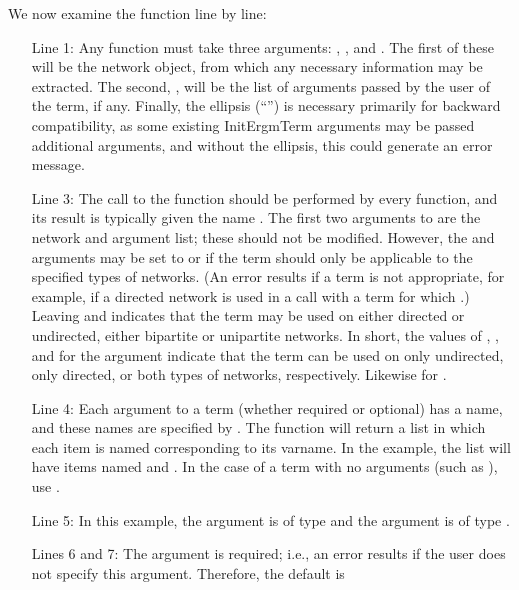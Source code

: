 \documentclass[nojss]{jss}
\begin{document}
We now examine the  function line by line:
\begin{itemize}
\item[Line 1:]
Any  function must take three arguments:
, , and .  The first of these will be the network object, from
which any necessary information may be extracted.  The second, ,
will be the list of arguments passed by the user of the term, if any.  Finally, the ellipsis (``'')
is necessary primarily for backward compatibility, as some existing InitErgmTerm arguments may
be passed additional arguments, and without the ellipsis, this could generate an error message.
\item[Line 3:]
The call to the  function should be performed by every
 function, and its result is typically given the name .
The first two arguments to  are the network and argument list; these
should not be modified.  However, the  and  arguments may
be set to  or  if the term should only be applicable to the specified
types of networks.  (An error results if a term is not appropriate, for example, if a directed network
is used in a call with a term for which .)  Leaving 
and  indicates that the term may be used on either directed or
undirected, either bipartite or unipartite networks. In short, the values of , , and  for the
argument  indicate that the term can be used on only undirected, only directed, or both types
of networks, respectively.  Likewise for .
\item[Line 4:]  Each argument to a term  (whether required or optional) has a name, and these names are
specified by .  The 
function will return a list in which each item is named corresponding to its varname.
In the example, the list will have items named  and .
In the case of a term with no arguments (such as ), use
.
\item[Line 5:] In this example, the argument  is of type
 and the argument  is of type .
\item[Lines 6 and 7:] The  argument is required; i.e., an error results
if the user does not specify this argument.  Therefore, the default  is

\end{itemize}
\end{document}

